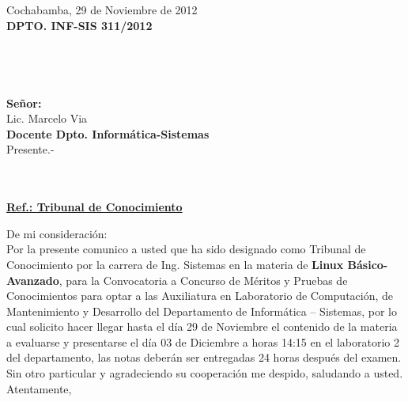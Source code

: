 \documentclass[letterpaper,11pt]{letter}
\begin{document}
Cochabamba, 29 de Noviembre de 2012~\\
 \textbf{DPTO. INF-SIS 311/2012}\\
~\\
~\\
~\\
~\\
 \textbf{Señor:}~\\
Lic. Marcelo Via~\\
 \textbf{Docente Dpto. Informática-Sistemas}~\\
Presente.-\\
~\\
~\\
\begin{center}
\underline{ \textbf{Ref.: Tribunal de Conocimiento}}
\end{center}
De mi consideración:\\
Por la presente comunico a usted que ha sido designado como Tribunal de Conocimiento por la carrera de Ing. Sistemas en la materia de \textbf{Linux Básico-Avanzado}, para la Convocatoria a Concurso de Méritos y Pruebas de Conocimientos para optar a las Auxiliatura en Laboratorio de Computación, de Mantenimiento y Desarrollo del Departamento de Informática – Sistemas, por lo cual solicito hacer llegar hasta el día 29 de Noviembre el contenido de la materia a evaluarse y presentarse el día 03 de Diciembre a horas 14:15 en el laboratorio 2 del departamento, las notas deberán ser entregadas 24 horas después del examen.\\
Sin otro particular y agradeciendo su cooperación me despido, saludando a usted.\\
Atentamente,\\
\end{document}
